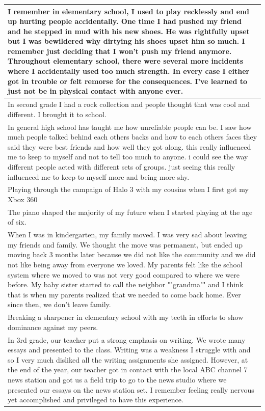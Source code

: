 \documentclass[
  .7em,
  letterpaper,
  DIV=11,
  numbers=noendperiod]{scrartcl}
\begin{document}
\begin{table}
\begin{tabular}{l}
\hline
I remember in elementary school, I used to play recklessly and end up hurting people accidentally. One time I had pushed my friend and he stepped in mud with his new shoes. He was rightfully upset but I was bewildered why dirtying his shoes upset him so much. I remember just deciding that I won’t push my friend anymore. Throughout elementary school, there were several more incidents where I accidentally used too much strength. In every case I either got in trouble or felt remorse for the consequences. I’ve learned to just not be in physical contact with anyone ever.\\
\hline
In second grade I had a rock collection and people thought that was cool and different. I brought it to school.\\
\hline
In general high school has taught me how unreliable people can be. I saw how much people talked behind each others backs and how to each others faces they said they were best friends and how well they got along. this really influenced me to keep to myself and not to tell too much to anyone. i could see the way different people acted with different sets of groups. just seeing this really influenced me to keep to myself more and being more shy.\\
\hline
Playing through the campaign of Halo 3 with my cousins when I first got my Xbox 360\\
\hline
The piano shaped the majority of my future when I started playing at the age of six.\\
\hline
When I was in kindergarten, my family moved. I was very sad about leaving my friends and family. We thought the move was permanent, but ended up moving back 3 months later because we did not like the community and we did not like being away from everyone we loved. My parents felt like the school system where we moved to was not very good compared to where we were before. My baby sister started to call the neighbor ""grandma"" and I think that is when my parents realized that we needed to come back home. Ever since then, we don't leave family.\\
\hline
Breaking a sharpener in elementary school with my teeth in efforts to show dominance against my peers.\\
\hline
In 3rd grade, our teacher put a strong emphasis on writing. We wrote many essays and presented to the class. Writing was a weakness I struggle with and so I very much disliked all the writing assignments she assigned. However, at the end of the year, our teacher got in contact with the local ABC channel 7 news station and got us a field trip to go to the news studio where we presented our essays on the news station set. I remember feeling really nervous yet accomplished and privileged to have this experience.\\

\end{tabular}
\end{table}
\end{document}

